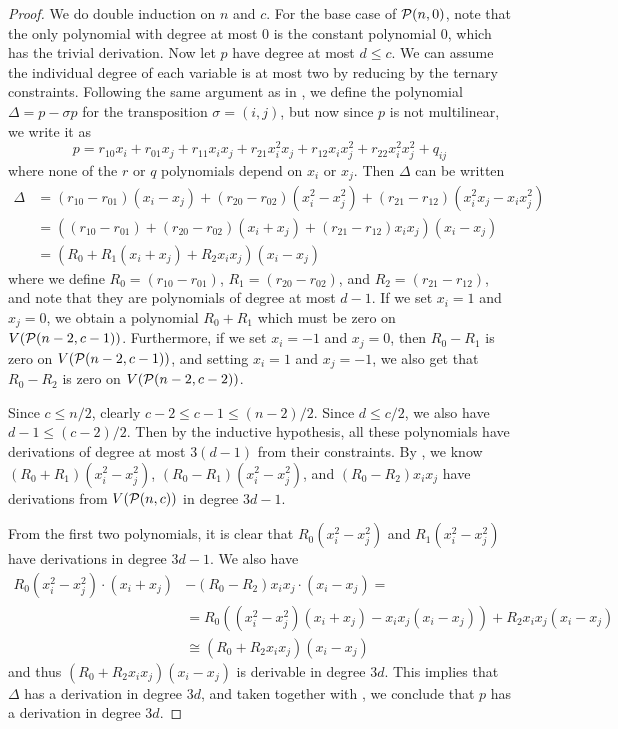 \begin{proof}
We do double induction on $n$ and $c$. For the base case of $\mathcal P(n,0)$, note that the only polynomial with degree at most $0$ is the constant polynomial $0$, which has the trivial derivation. Now let $p$ have degree at most $d \leq c$. We can assume the individual degree of each variable is at most two by reducing by the ternary constraints. Following the same argument as in , we define the polynomial $\Delta = p - \sigma p$ for the transposition $\sigma = (i,j)$, but now since $p$ is not multilinear, we write it as 
\[p = r_{10}x_i + r_{01}x_j + r_{11}x_ix_j + r_{21}x_i^2x_j + r_{12}x_ix_j^2 + r_{22}x_i^2x_j^2 + q_{ij}\]
where none of the $r$ or $q$ polynomials depend on $x_i$ or $x_j$. Then $\Delta$ can be written
\begin{align*}
\Delta &= (r_{10} - r_{01})(x_i - x_j) + (r_{20} - r_{02})(x_i^2 - x_j^2) + (r_{21} - r_{12})(x_i^2x_j - x_ix_j^2) \\
&= ((r_{10} - r_{01}) + (r_{20} - r_{02})(x_i+x_j) + (r_{21} - r_{12})x_ix_j)(x_i - x_j) \\
&= (R_0 + R_1(x_i + x_j) + R_2x_ix_j)(x_i - x_j)
\end{align*}
where we define $R_0 = (r_{10} - r_{01})$, $R_1 = (r_{20} - r_{02})$, and $R_2 = (r_{21} - r_{12})$, and note that they are polynomials of degree at most $d-1$. If we set $x_i = 1$ and $x_j = 0$, we obtain a polynomial $R_0 + R_1$ which must be zero on $V(\mathcal P(n-2,c-1))$. Furthermore, if we set $x_i = -1$ and $x_j = 0$, then $R_0 - R_1$ is zero on $V(\mathcal P(n-2,c-1))$, and setting $x_i = 1$ and $x_j = -1$, we also get that $R_0 - R_2$ is zero on $V(\mathcal P(n-2,c-2))$. 

Since $c \leq n/2$, clearly $c-2 \leq c-1 \leq (n-2)/2$. Since $d \leq c/2$, we also have $d-1 \leq (c-2)/2$. Then by the inductive hypothesis, all these polynomials have derivations of degree at most $3(d-1)$ from their constraints. By , we know $(R_0+R_1)(x_i^2-x_j^2)$, $(R_0 - R_1)(x_i^2-x_j^2)$, and $(R_0 - R_2)x_ix_j$ have derivations from $V(\mathcal P(n,c))$ in degree $3d-1$.

From the first two polynomials, it is clear that $R_0(x_i^2-x_j^2)$ and $R_1(x_i^2-x_j^2)$ have derivations in degree $3d-1$. We also have
\begin{align*}
R_0(x_i^2-x_j^2) \cdot (x_i+x_j) &- (R_0 - R_2)x_ix_j \cdot (x_i - x_j) = \\&= R_0((x_i^2 - x_j^2)(x_i+x_j) - x_ix_j(x_i - x_j)) + R_2x_ix_j(x_i - x_j) \\
&\cong (R_0 + R_2x_ix_j)(x_i - x_j)
\end{align*}
and thus $(R_0 + R_2x_ix_j)(x_i - x_j)$ is derivable in degree $3d$. This implies that $\Delta$ has a derivation in degree $3d$, and taken together with , we conclude that $p$ has a derivation in degree $3d$. 
\end{proof}

